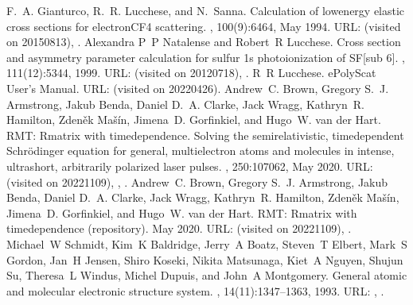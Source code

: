 \documentclass[letterpaper,10pt,english]{jupyterBook}
\begin{document}
\begin{sphinxthebibliography}{10}
\sphinxAtStartPar
F. A. Gianturco, R. R. Lucchese, and N. Sanna. Calculation of low\sphinxhyphen{}energy elastic cross sections for electron\sphinxhyphen{}CF4 scattering. , 100(9):6464, May 1994. URL:  (visited on 2015\sphinxhyphen{}08\sphinxhyphen{}13), .
\sphinxAtStartPar
Alexandra P P Natalense and Robert R Lucchese. Cross section and asymmetry parameter calculation for sulfur 1s photoionization of SF{[}sub 6{]}. , 111(12):5344, 1999. URL:  (visited on 2012\sphinxhyphen{}07\sphinxhyphen{}18), .
\sphinxAtStartPar
R R Lucchese. ePolyScat User's Manual. URL:  (visited on 2022\sphinxhyphen{}04\sphinxhyphen{}26).
\sphinxAtStartPar
Andrew C. Brown, Gregory S. J. Armstrong, Jakub Benda, Daniel D. A. Clarke, Jack Wragg, Kathryn R. Hamilton, Zdeněk Mašín, Jimena D. Gorfinkiel, and Hugo W. van der Hart. RMT: R\sphinxhyphen{}matrix with time\sphinxhyphen{}dependence. Solving the semi\sphinxhyphen{}relativistic, time\sphinxhyphen{}dependent Schrödinger equation for general, multielectron atoms and molecules in intense, ultrashort, arbitrarily polarized laser pulses. , 250:107062, May 2020. URL:  (visited on 2022\sphinxhyphen{}11\sphinxhyphen{}09), , .
\sphinxAtStartPar
Andrew C. Brown, Gregory S. J. Armstrong, Jakub Benda, Daniel D. A. Clarke, Jack Wragg, Kathryn R. Hamilton, Zdeněk Mašín, Jimena D. Gorfinkiel, and Hugo W. van der Hart. RMT: R\sphinxhyphen{}matrix with time\sphinxhyphen{}dependence (repository). May 2020. URL:  (visited on 2022\sphinxhyphen{}11\sphinxhyphen{}09), .
\sphinxAtStartPar
Michael W Schmidt, Kim K Baldridge, Jerry A Boatz, Steven T Elbert, Mark S Gordon, Jan H Jensen, Shiro Koseki, Nikita Matsunaga, Kiet A Nguyen, Shujun Su, Theresa L Windus, Michel Dupuis, and John A Montgomery. General atomic and molecular electronic structure system. , 14(11):1347–1363, 1993. URL: , .

\end{sphinxthebibliography}
\end{document}
